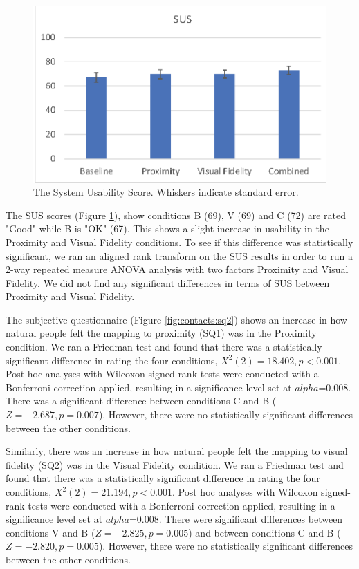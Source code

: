 \begin{figure}[ht]
    \centering
    \includegraphics[width=0.8\linewidth]{images/mgia17/analysis-images-02.eps}
    \caption{The System Usability Score. Whiskers indicate standard error.}
    \label{fig:contacts:sus}
\end{figure}
The SUS scores (Figure \ref{fig:contacts:sus}), show conditions B (69), V (69) and C (72) are rated "Good" while B is "OK" (67). This shows a slight increase in usability in the Proximity and Visual Fidelity conditions. To see if this difference was statistically significant, we ran an aligned rank transform on the SUS results in order to run a 2-way repeated measure ANOVA analysis with two factors Proximity and Visual Fidelity. We did not find any significant differences in terms of SUS between Proximity and Visual Fidelity. 

The subjective questionnaire (Figure \ref{fig:contacts:sq2}) shows an increase in how natural people felt the mapping to proximity (SQ1) was in the Proximity condition. We ran a Friedman test and found that there was a statistically significant difference in rating the four conditions, $X^2(2)=18.402,p<0.001$. Post hoc analyses with Wilcoxon signed-rank tests were conducted with a Bonferroni correction applied, resulting in a significance level set at $alpha$=0.008. There was a significant difference between conditions C and B ($Z=-2.687, p=0.007$). However, there were no statistically significant differences between the other conditions.

Similarly, there was an increase in how natural people felt the mapping to visual fidelity (SQ2) was in the Visual Fidelity condition. We ran a Friedman test and found that there was a statistically significant difference in rating the four conditions, $X^2(2)=21.194,p<0.001$. Post hoc analyses with Wilcoxon signed-rank tests were conducted with a Bonferroni correction applied, resulting in a significance level set at $alpha$=0.008. There were significant differences between conditions V and B  ($Z=-2.825, p=0.005$) and between conditions C and B ($Z=-2.820, p=0.005$). However, there were no statistically significant differences between the other conditions.

